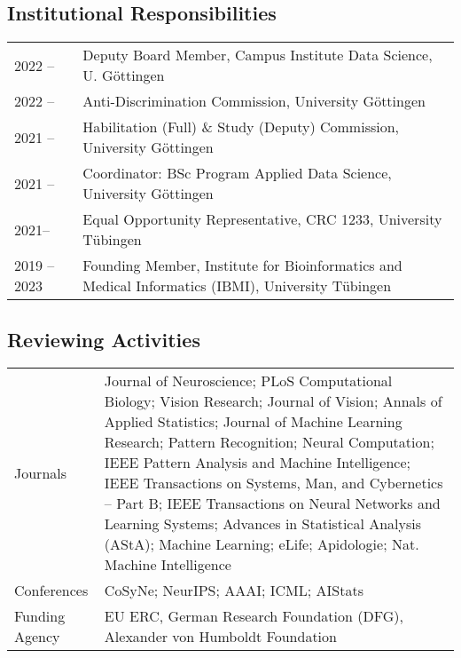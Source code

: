 \documentclass[COG,11pt]{ercgrant}
\begin{document}
\subsection{Institutional Responsibilities}
\begin{tabular}{p{3cm}p{12cm}}
2022 -- & Deputy Board Member, Campus Institute Data Science, U. Göttingen\\
2022 -- & Anti-Discrimination Commission, University Göttingen\\
2021 -- & Habilitation (Full) \& Study (Deputy) Commission, University Göttingen\\
2021 -- & Coordinator: BSc Program Applied Data Science, University Göttingen\\
2021-- & Equal Opportunity Representative, CRC 1233, University T{\"u}bingen\\
2019 -- 2023 & Founding Member, Institute for Bioinformatics and Medical Informatics (IBMI), University T{\"u}bingen \\
\end{tabular}

\subsection{Reviewing Activities}
\begin{tabular}{p{3cm}p{12cm}}
Journals & Journal of Neuroscience; PLoS Computational Biology; Vision Research; Journal of Vision; Annals of Applied Statistics; Journal of Machine Learning Research; Pattern Recognition; Neural Computation; IEEE Pattern Analysis and Machine Intelligence; IEEE Transactions on Systems, Man, and Cybernetics – Part B; IEEE Transactions on Neural Networks and Learning Systems; Advances in Statistical Analysis (AStA); Machine Learning; eLife; Apidologie; Nat. Machine Intelligence\\
Conferences & CoSyNe; NeurIPS; AAAI; ICML; AIStats\\
Funding Agency & EU ERC, German Research Foundation (DFG), Alexander von Humboldt Foundation\\
\end{tabular}
\end{document}
